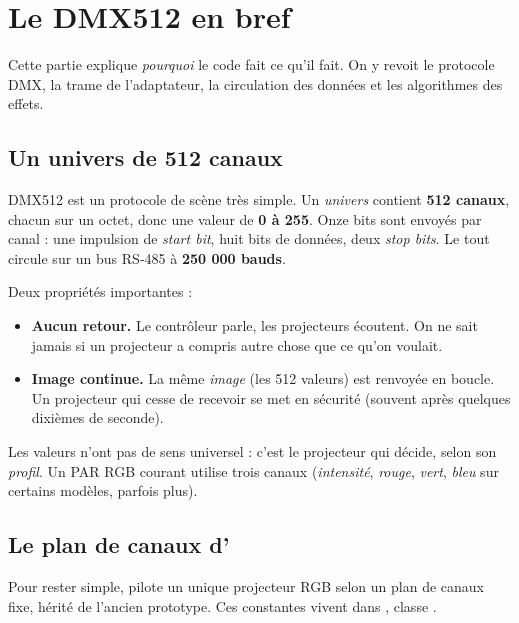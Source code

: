 
\chapter{Le DMX512 en bref}
\label{ch:dmx}

Cette partie explique \emph{pourquoi} le code fait ce qu'il fait. On y revoit le
protocole DMX, la trame de l'adaptateur, la circulation des données et les
algorithmes des effets.

\section{Un univers de 512 canaux}

DMX512 est un protocole de scène très simple. Un \emph{univers} contient
\textbf{512 canaux}, chacun sur un octet, donc une valeur de \textbf{0 à 255}.
Onze bits sont envoyés par canal : une impulsion de \emph{start bit}, huit bits de
données, deux \emph{stop bits}. Le tout circule sur un bus RS-485 à
\textbf{250 000 bauds}.

Deux propriétés importantes :

\begin{itemize}[leftmargin=1.4em]
  \item \textbf{Aucun retour.} Le contrôleur parle, les projecteurs écoutent.
        On ne sait jamais si un projecteur a compris autre chose que ce qu'on
        voulait.
  \item \textbf{Image continue.} La même \emph{image} (les 512 valeurs) est
        renvoyée en boucle. Un projecteur qui cesse de recevoir se met en
        sécurité (souvent après quelques dixièmes de seconde).
\end{itemize}

Les valeurs n'ont pas de sens universel : c'est le projecteur qui décide, selon
son \emph{profil}. Un PAR RGB courant utilise trois canaux (\emph{intensité},
\emph{rouge}, \emph{vert}, \emph{bleu} sur certains modèles, parfois plus).

\section{Le plan de canaux d'\Icare{}}

Pour rester simple, \Icare{} pilote un unique projecteur RGB selon un plan de
canaux fixe, hérité de l'ancien prototype. Ces constantes vivent dans
, classe .

